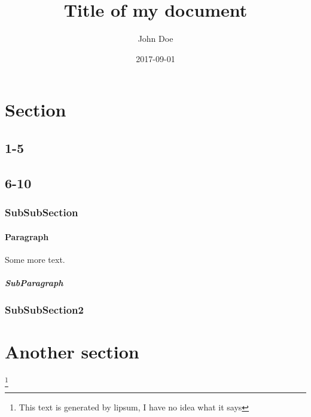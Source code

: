 \documentclass{article}
\title{Title of my document}
\date{2017-09-01}
\author{John Doe}
\begin{document}
\maketitle
\newpage
\tableofcontents
\newpage

%
\section{Section}
\subsection{1-5}
\lipsum[1-5]
\subsection{6-10}
\lipsum[1-5]
\subsubsection{SubSubSection}
\paragraph{Paragraph}
Some more text.
\lipsum[11]
\subparagraph{SubParagraph}
\lipsum[12]
\subsubsection{SubSubSection2}
\lipsum[13-19]
\section{Another section}
\lipsum*[20]
\footnote{\label{lipsum}This text is generated by lipsum, I have no
idea what it says}
\end{document}
